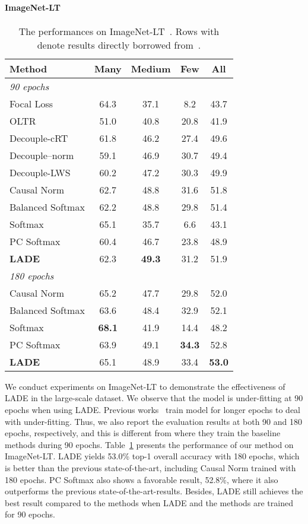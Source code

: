 \documentclass[final]{cvpr}
\begin{document}
\paragraph{ImageNet-LT}
\label{subsec:imagenet_lt}
\begin{table}[t]
\footnotesize
\centering
\caption{The performances on ImageNet-LT~\cite{liu2019large}. Rows with  denote results directly borrowed from~\cite{tang2020long}.}
\vspace{0px}
{
\begin{tabular}{l |c c c| c }
\toprule
Method & Many & Medium & Few & \textbf{All} \\ 
\midrule
\textit{90 epochs} & & & & \\
Focal Loss & 64.3 & 37.1 & 8.2 & 43.7 \\
OLTR & 51.0 & 40.8 & 20.8 & 41.9       \\
Decouple-cRT & 61.8 & 46.2 & 27.4 & 49.6 \\
Decouple--norm & 59.1 & 46.9 & 30.7 & 49.4\\
Decouple-LWS & 60.2 & 47.2 & 30.3 & 49.9\\
Causal Norm & 62.7 & 48.8 & 31.6 & 51.8 \\
Balanced Softmax & 62.2	& 48.8 & 29.8 & 51.4 \\
Softmax & 65.1 & 35.7 & 6.6 & 43.1 \\\midrule
PC Softmax & 60.4 & 46.7 & 23.8 & 48.9 \\
\textbf{LADE} & 62.3 & \textbf{49.3} & 31.2 & 51.9 \\
\midrule
\midrule
\textit{180 epochs} & & & & \\
Causal Norm & 65.2 & 47.7 & 29.8 & 52.0 \\
Balanced Softmax & 63.6 & 48.4 & 32.9 & 52.1 \\
Softmax & \textbf{68.1} & 41.9 & 14.4 & 48.2 \\\midrule
PC Softmax & 63.9  & 49.1 & \textbf{34.3} & 52.8 \\
\textbf{LADE} & 65.1 & 48.9 & 33.4 & \textbf{53.0} \\
\bottomrule
\end{tabular}
}
\label{tab:imagenet_main}
\vspace{0mm}
\end{table} We conduct experiments on ImageNet-LT to demonstrate the effectiveness of LADE in the large-scale dataset.
We observe that the model is under-fitting at 90 epochs when using LADE.
Previous works~\cite{kang2019decoupling, zhou2020bbn} train model for longer epochs to deal with under-fitting.
Thus, we also report the evaluation results at both 90 and 180 epochs, respectively, and this is different from \cite{tang2020long} where they train the baseline methods during 90 epochs.
Table~\ref{tab:imagenet_main} presents the performance of our method on ImageNet-LT.
LADE yields 53.0\% top-1 overall accuracy with 180 epochs, which is better than the previous state-of-the-art, including Causal Norm trained with 180 epochs.
PC Softmax also shows a favorable result, 52.8\%, where it also outperforms the previous state-of-the-art-results.
Besides, LADE still achieves the best result compared to the methods when LADE and the methods are trained for 90 epochs.
\end{document}
